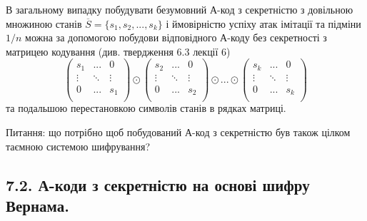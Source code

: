 \begin{example}
    В загальному випадку побудувати безумовний А-код з секретністю з
    довільною множиною станів $\overline{S} = \{s_1, s_2, ..., s_k\}$ і ймовірністю успіху атак імітації
    та підміни $1/n$ можна за допомогою побудови відповідного А-коду без
    секретності з матрицею кодування (див. твердження 6.3 лекції 6)
    \begin{equation*}
        \begin{pmatrix}
                s_1 & ... & 0 \\
                \vdots & \ddots & \vdots \\
                0 & ... & s_1 \\
            \end{pmatrix}
            \odot \begin{pmatrix}
                s_2 & ... & 0 \\
                \vdots & \ddots & \vdots \\
                0 & ... & s_2 \\
            \end{pmatrix}
            \odot ...
            \odot \begin{pmatrix}
                s_k & ... & 0 \\
                \vdots & \ddots & \vdots \\
                0 & ... & s_k \\
            \end{pmatrix}
    \end{equation*}
    та подальшою перестановкою символів станів в рядках матриці.
    
    Питання: що потрібно щоб побудований А-код з секретністю був також цілком
    таємною системою шифрування?
\end{example}

\subsection{7.2. А-коди з секретністю на основі шифру Вернама.}

